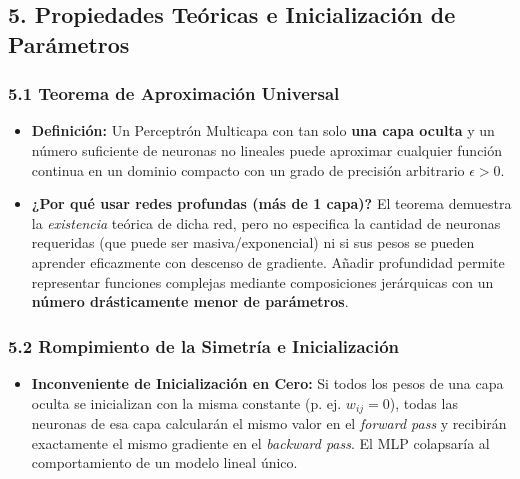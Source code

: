 \documentclass[11pt,oneside]{article}
\begin{document}
\subsection{5. Propiedades Teóricas e Inicialización de Parámetros}

\subsubsection{5.1 Teorema de Aproximación Universal}

\begin{itemize}

\item \textbf{Definición:} Un Perceptrón Multicapa con tan solo \textbf{una capa oculta} y un número suficiente de neuronas no lineales puede aproximar cualquier función continua en un dominio compacto con un grado de precisión arbitrario \(\epsilon > 0\).

\end{itemize}

\begin{itemize}

\item \textbf{¿Por qué usar redes profundas (más de 1 capa)?} El teorema demuestra la \emph{existencia} teórica de dicha red, pero no especifica la cantidad de neuronas requeridas (que puede ser masiva/exponencial) ni si sus pesos se pueden aprender eficazmente con descenso de gradiente. Añadir profundidad permite representar funciones complejas mediante composiciones jerárquicas con un \textbf{número drásticamente menor de parámetros}.

\end{itemize}

\subsubsection{5.2 Rompimiento de la Simetría e Inicialización}

\begin{itemize}

\item \textbf{Inconveniente de Inicialización en Cero:} Si todos los pesos de una capa oculta se inicializan con la misma constante (p. ej. \(w_{ij} = 0\)), todas las neuronas de esa capa calcularán el mismo valor en el \emph{forward pass} y recibirán exactamente el mismo gradiente en el \emph{backward pass}. El MLP colapsaría al comportamiento de un modelo lineal único.

\end{itemize}
\end{document}
